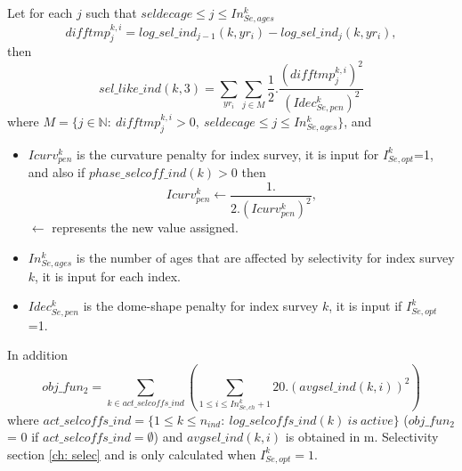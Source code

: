 \documentclass{article}
\begin{document}
\begin{itemize}
    Let for each $j$ such that $seldecage \leq j \leq In_{Se,ages}^k$
    \begin{equation}
        difftmp_j^{k,i}= log\_sel\_ind_{j-1}(k,yr_i)-log\_sel\_ind_j(k,yr_i),
    \end{equation}
     then
    \begin{equation}
sel\_like\_ind(k,3)    =\sum_{yr_i}\sum_{j\in M} \dfrac{1}{2}.\dfrac{(difftmp_j^{k,i} )^2}{(Idec_{Se,pen}^k)^2}
    \end{equation}
    where $M=\{j\in\mathbb{N}: \ difftmp_j^{k,i}>0, \ seldecage \leq j \leq In_{Se,ages}^k\}$, and 
    \begin{itemize}
        \item $Icurv_{pen}^k$ is the curvature penalty for index survey, it is input for $I_{Se,opt}^k$=1,  and also
        if $phase\_selcoff\_ind(k)>0$ then
        \begin{equation*}
    Icurv_{pen}^k \leftarrow \dfrac{1.} {{2.(Icurv_{pen}^k)}^2},
        \end{equation*}
        $\leftarrow$ represents the new value assigned.
        \item $In_{Se,ages}^k$ is the number of ages that are affected by selectivity for index survey $k$, it is input for each index.
        \item $Idec_{Se,pen}^k$ is the dome-shape penalty for index survey $k$, it is input if $I_{Se,opt}^k$=1.
    \end{itemize}
\end{itemize}


In addition
    \begin{equation} \label{objfun2}
obj\_fun_2= \sum_{k\in act\_selcoffs\_ind}\left(\sum_{1\leq i \leq In_{Se,ch}^k+1}20 .(avgsel\_ind(k,i))^2\right)
    \end{equation}
    where $act\_selcoffs\_ind=\{1\leq k \leq  n_{ind}: \ log\_selcoffs\_ind(k)\  is \ active\}$ ($obj\_fun_2$ = 0 if $act\_selcoffs\_ind = \emptyset$) and $avgsel\_ind(k,i)$ is obtained in m. Selectivity section \ref{ch: selec} and is only calculated when $I^k_{Se,opt}=1$.
\end{document}

